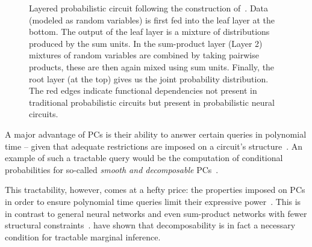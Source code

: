 \documentclass[letterpaper]{article} %
\begin{document}
\begin{figure}[t]
{
	}
	\caption{Layered probabilistic circuit following the construction of~\citep{shih2021hyperspns}. Data (modeled as random variables) is first fed into the leaf layer at the bottom. The output of the leaf layer is a mixture of distributions produced by the sum units. In the sum-product layer (Layer 2)  mixtures of random variables are combined by taking pairwise products, these are then again mixed using sum units. Finally, the root layer (at the top) gives us the joint probability distribution. The red edges indicate functional dependencies not present in traditional probabilistic circuits but present in probabilistic neural circuits.}
	\label{fig:circuit}
\end{figure}


A major advantage of PCs is their ability to answer certain queries in polynomial time -- given that adequate restrictions are imposed on a circuit's structure~\citep{vergari2021compositional}. An example of such a tractable query would be the computation of conditional probabilities for so-called \textit{smooth and decomposable} PCs~\citep{darwiche2001decomposable,darwiche2003differential}.

This tractability, however, comes at a hefty price: the properties imposed on PCs in order to ensure polynomial time queries limit their expressive power~\citep{martens2014expressive,sharir2018sum,zhang2021probabilistic}.
This is in contrast to general neural networks and even sum-product networks with fewer structural constraints~\citep{delalleau2011shallow,kileel2019expressive}. \citet{martens2014expressive} have shown that decomposability is in fact a necessary condition for tractable marginal inference.
\end{document}
